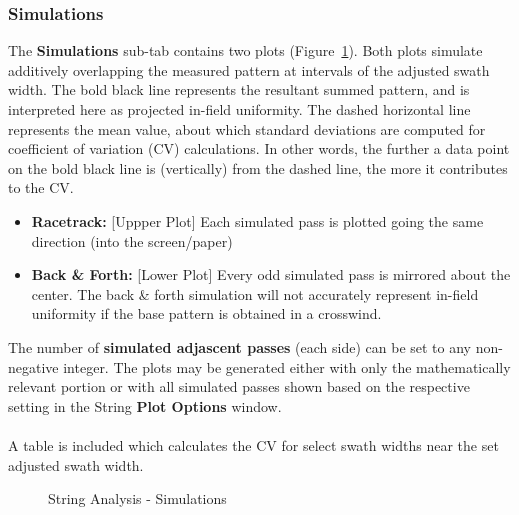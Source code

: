 \documentclass[10pt,letterpaper,titlepage]{article}
\begin{document}
    \subsubsection{Simulations}
    The \textbf{Simulations} sub-tab contains two plots (Figure~\ref{fig:string_simulations}). Both plots simulate additively overlapping the measured pattern at intervals of the adjusted swath width. The bold black line represents the resultant summed pattern, and is interpreted here as projected in-field uniformity. The dashed horizontal line represents the mean value, about which standard deviations are computed for coefficient of variation (CV) calculations. In other words, the further a data point on the bold black line is (vertically) from the dashed line, the more it contributes to the CV.
    \begin{itemize}
        \item \textbf{Racetrack:} [Uppper Plot] Each simulated pass is plotted going the same direction (into the screen/paper)
        \item \textbf{Back \& Forth:} [Lower Plot] Every odd simulated pass is mirrored about the center. \color{red} The back \& forth simulation will not accurately represent in-field uniformity if the base pattern is obtained in a crosswind. \color{black}
    \end{itemize}
    The number of \textbf{simulated adjascent passes} (each side) can be set to any non-negative integer. The plots may be generated either with only the mathematically relevant portion or with all simulated passes shown based on the respective setting in the String \textbf{Plot Options} window.
    \\\\
    A table is included which calculates the CV for select swath widths near the set adjusted swath width.
    \begin{figure}[hb]
        \centering
        \caption{String Analysis - Simulations}
        \label{fig:string_simulations}
    \end{figure}
    \newpage
\end{document}
